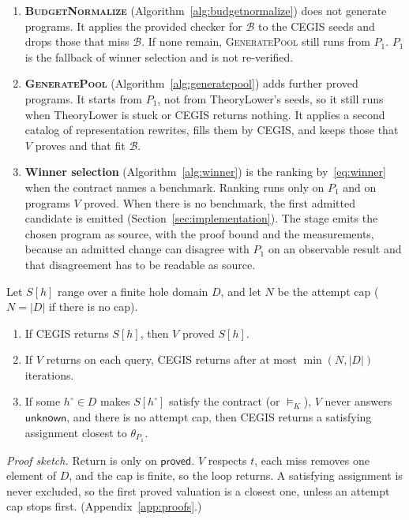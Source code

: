 \begin{enumerate}
  \item \textbf{\textsc{BudgetNormalize}} (Algorithm~\ref{alg:budgetnormalize}) does not generate programs. It
  applies the provided checker for \(\mathcal{B}\) to the CEGIS seeds
  and drops those that miss \(\mathcal{B}\). If none remain,
  \textsc{GeneratePool} still runs from \(P_1\). \(P_1\) is the fallback of
  winner selection and is not re-verified.

  \item \textbf{\textsc{GeneratePool}} (Algorithm~\ref{alg:generatepool}) adds further proved programs. It
  starts from \(P_1\), not from TheoryLower's seeds, so it still runs when
  TheoryLower is stuck or CEGIS returns nothing. It applies a second catalog
  of representation rewrites, fills them by CEGIS, and keeps those that
  \(V\) proves and that fit \(\mathcal{B}\).

  \item \textbf{Winner selection} (Algorithm~\ref{alg:winner}) is the ranking by~\eqref{eq:winner}
  when the contract names a benchmark. Ranking runs only on \(P_1\) and on
  programs \(V\) proved.
  When there is no benchmark, the first admitted candidate is emitted
  (Section~\ref{sec:implementation}). The stage emits the chosen program as
  source, with the proof bound and the measurements, because an admitted
  change can disagree with \(P_1\) on an observable result and that
  disagreement has to be readable as source.
\end{enumerate}

\begin{theorem}
\label{thm:cegis}
Let \(S[h]\) range over a finite hole domain \(D\), and let \(N\) be the
attempt cap (\(N = |D|\) if there is no cap).
\begin{enumerate}
  \item If CEGIS returns \(S[h]\), then \(V\) proved \(S[h]\).
  \item If \(V\) returns on each query, CEGIS returns after at most
  \(\min(N, |D|)\) iterations.
  \item If some \(h^\circ \in D\) makes \(S[h^\circ]\) satisfy the contract
  (or \(\models_K\)), \(V\) never answers \(\mathsf{unknown}\), and there is
  no attempt cap, then CEGIS returns a satisfying assignment closest to
  \(\theta_{P_1}\).
\end{enumerate}
\end{theorem}

\noindent\emph{Proof sketch.}
Return is only on \(\mathsf{proved}\). \(V\) respects \(t\), each miss
removes one element of \(D\), and the cap is finite, so the loop returns.
A satisfying assignment is never excluded, so the first proved valuation is
a closest one, unless an attempt cap stops first.
(Appendix~\ref{app:proofs}.)

